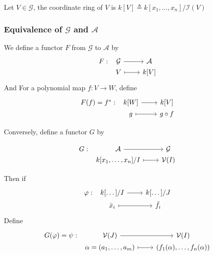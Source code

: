 \begin{definition}
  Let $V \in \mathcal{G}$, the coordinate ring of $V$ is $k[V] \triangleq k[x_1, \dots, x_n] / \mathcal{I}(V)$
\end{definition}

\subsubsection{Equivalence of $\mathcal{G}$ and $\mathcal{A}$}
We define a functor $F$ from $\mathcal{G}$ to $\mathcal{A}$ by
  \[
    \begin{tikzcd}[column sep=0.8cm,row sep=0ex]
      F: &[-0.7cm] \mathcal{G} \arrow[r] & \mathcal{A} \\
      & V \arrow[r, mapsto] & k[V]
    \end{tikzcd}
  \]
  And For a polynomial map $f : V \to W$, define
  \[
    \begin{tikzcd}[column sep=0.8cm,row sep=0ex]
      F(f) = f^*: &[-0.7cm] k[W] \arrow[r] & k[V] \\
      & g \arrow[r, mapsto] & g \circ f
    \end{tikzcd}
  \]

  Conversely, define a functor $G$ by

  \[
    \begin{tikzcd}[column sep=0.8cm,row sep=0ex]
      G: &[-0.7cm] \mathcal{A} \arrow[r] & \mathcal{G} \\
      & k[x_1, \dots, x_n]/I \arrow[r, mapsto] & \Vc(I)
    \end{tikzcd}
  \]

  Then if
  \[
    \begin{tikzcd}[column sep=0.8cm,row sep=0ex]
      \varphi: &[-0.7cm] k[\dots]/I \arrow[r] & k[\dots]/J \\
      & \bar{x}_i \arrow[r, mapsto] & \bar{f}_i
    \end{tikzcd}
  \]
  Define
  \[
    \begin{tikzcd}[column sep=0.8cm,row sep=0ex]
      G(\varphi) = \psi: &[-0.7cm] \Vc(J) \arrow[r] & \Vc(I) \\
      & \alpha = (a_1, \dots, a_m) \arrow[r, mapsto] & (f_1(\alpha), \dots, f_n(\alpha))
    \end{tikzcd}
  \]
